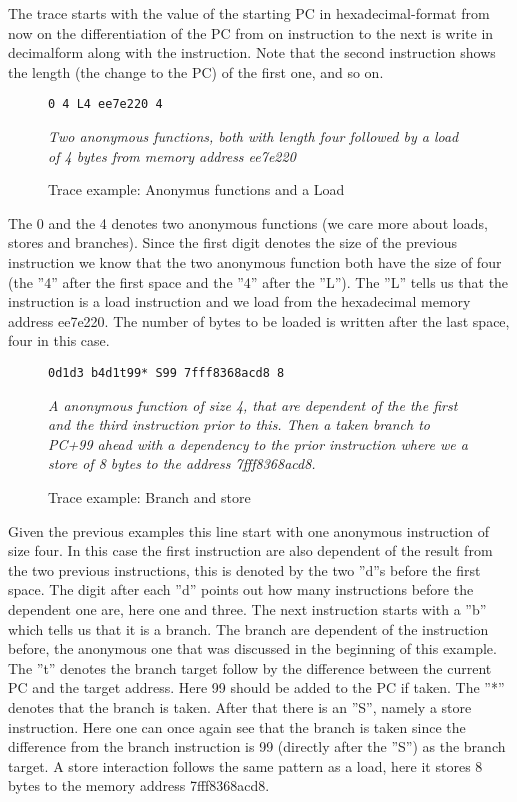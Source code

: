 The trace starts with the value of the starting PC in hexadecimal-format from now on the differentiation of the PC from on instruction to the next is write in decimalform
along with the instruction. Note that the second instruction shows the length
(the change to the PC) of the first one, and so on.

\begin{figure}[h]
\begin{lstlisting}[frame=single]  
0 4 L4 ee7e220 4
\end{lstlisting}
\centering
\emph{Two anonymous functions, both with length four followed by a load of 4
bytes from memory address ee7e220}
  \caption{Trace example: Anonymus functions and a Load}
\end{figure}

The 0 and the 4 denotes two anonymous functions (we care more about loads,
stores and branches). Since the first digit denotes the size of the previous instruction
we know that the two anonymous function both have the size of four (the ”4” after
the first space and the ”4” after the ”L”). The ”L” tells us that the instruction is
a load instruction and we load from the hexadecimal memory address ee7e220. The
number of bytes to be loaded is written after the last space, four in this case.

\begin{figure}[h]
\begin{lstlisting}[frame=single]  
0d1d3 b4d1t99* S99 7fff8368acd8 8
\end{lstlisting}
\centering
\emph{A anonymous function of size 4, that are dependent of the the first
and the third instruction prior to this. Then a taken branch to PC+99 ahead with
a dependency to the prior instruction where we a store of 8 bytes to the address
7fff8368acd8.}
  \caption{Trace example: Branch and store}
\end{figure}

Given the previous examples this line start with one anonymous instruction of
size four. In this case the first instruction are also dependent of the result from the
two previous instructions, this is denoted by the two ”d”s before the first space. The
digit after each ”d” points out how many instructions before the dependent one are,
here one and three. The next instruction starts with a ”b” which tells us that it is a
branch. The branch are dependent of the instruction before, the anonymous one that
was discussed in the beginning of this example. The ”t” denotes the branch target
follow by the difference between the current PC and the target address. Here 99
should be added to the PC if taken. The ”*” denotes that the branch is taken. After
that there is an ”S”, namely a store instruction. Here one can once again see that the
branch is taken since the difference from the branch instruction is 99 (directly after
the ”S”) as the branch target. A store interaction follows the same pattern as a load,
here it stores 8 bytes to the memory address 7fff8368acd8.


